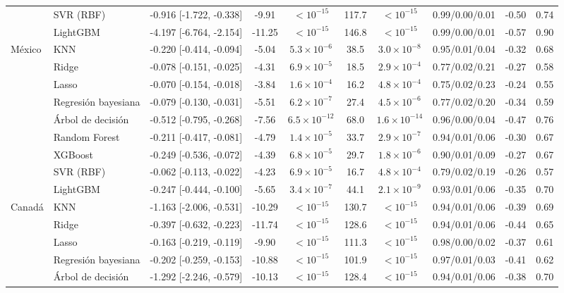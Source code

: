 \begin{longtable}{llcccccccc}
 & SVR (RBF) & -0.916 [-1.722, -0.338] & -9.91 & $<10^{-15}$ & 117.7 & $<10^{-15}$ & 0.99/0.00/0.01 & -0.50 & 0.74 \\
 & LightGBM & -4.197 [-6.764, -2.154] & -11.25 & $<10^{-15}$ & 146.8 & $<10^{-15}$ & 0.99/0.00/0.01 & -0.57 & 0.90 \\
\midrule
México & KNN & -0.220 [-0.414, -0.094] & -5.04 & $5.3\times10^{-6}$ & 38.5 & $3.0\times10^{-8}$ & 0.95/0.01/0.04 & -0.32 & 0.68 \\
 & Ridge & -0.078 [-0.151, -0.025] & -4.31 & $6.9\times10^{-5}$ & 18.5 & $2.9\times10^{-4}$ & 0.77/0.02/0.21 & -0.27 & 0.58 \\
 & Lasso & -0.070 [-0.154, -0.018] & -3.84 & $1.6\times10^{-4}$ & 16.2 & $4.8\times10^{-4}$ & 0.75/0.02/0.23 & -0.24 & 0.55 \\
 & Regresión bayesiana & -0.079 [-0.130, -0.031] & -5.51 & $6.2\times10^{-7}$ & 27.4 & $4.5\times10^{-6}$ & 0.77/0.02/0.20 & -0.34 & 0.59 \\
 & Árbol de decisión & -0.512 [-0.795, -0.268] & -7.56 & $6.5\times10^{-12}$ & 68.0 & $1.6\times10^{-14}$ & 0.96/0.00/0.04 & -0.47 & 0.76 \\
 & Random Forest & -0.211 [-0.417, -0.081] & -4.79 & $1.4\times10^{-5}$ & 33.7 & $2.9\times10^{-7}$ & 0.94/0.01/0.06 & -0.30 & 0.67 \\
 & XGBoost & -0.249 [-0.536, -0.072] & -4.39 & $6.8\times10^{-5}$ & 29.7 & $1.8\times10^{-6}$ & 0.90/0.01/0.09 & -0.27 & 0.67 \\
 & SVR (RBF) & -0.062 [-0.113, -0.022] & -4.23 & $6.9\times10^{-5}$ & 16.7 & $4.8\times10^{-4}$ & 0.79/0.02/0.19 & -0.26 & 0.57 \\
 & LightGBM & -0.247 [-0.444, -0.100] & -5.65 & $3.4\times10^{-7}$ & 44.1 & $2.1\times10^{-9}$ & 0.93/0.01/0.06 & -0.35 & 0.70 \\
\midrule
Canadá & KNN & -1.163 [-2.006, -0.531] & -10.29 & $<10^{-15}$ & 130.7 & $<10^{-15}$ & 0.94/0.01/0.06 & -0.39 & 0.69 \\
 & Ridge & -0.397 [-0.632, -0.223] & -11.74 & $<10^{-15}$ & 128.6 & $<10^{-15}$ & 0.94/0.01/0.06 & -0.44 & 0.65 \\
 & Lasso & -0.163 [-0.219, -0.119] & -9.90 & $<10^{-15}$ & 111.3 & $<10^{-15}$ & 0.98/0.00/0.02 & -0.37 & 0.61 \\
 & Regresión bayesiana & -0.202 [-0.259, -0.153] & -10.88 & $<10^{-15}$ & 101.9 & $<10^{-15}$ & 0.97/0.01/0.03 & -0.41 & 0.62 \\
 & Árbol de decisión & -1.292 [-2.246, -0.579] & -10.13 & $<10^{-15}$ & 128.4 & $<10^{-15}$ & 0.94/0.01/0.06 & -0.38 & 0.70 \\

\end{longtable}
